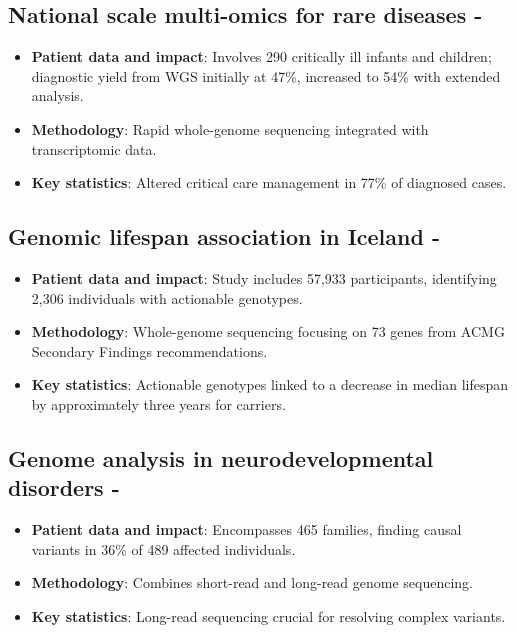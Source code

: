 \subsection*{National scale multi-omics for rare diseases - \citep{lunke2023integrated}}
\begin{itemize}
  \item \textbf{Patient data and impact}: Involves 290 critically ill infants and children; diagnostic yield from WGS initially at 47\%, increased to 54\% with extended analysis.
  \item \textbf{Methodology}: Rapid whole-genome sequencing integrated with transcriptomic data.
  \item \textbf{Key statistics}: Altered critical care management in 77\% of diagnosed cases.
\end{itemize}

\subsection*{Genomic lifespan association in Iceland - \citep{jensson2023actionable}}
\begin{itemize}
  \item \textbf{Patient data and impact}: Study includes 57,933 participants, identifying 2,306 individuals with actionable genotypes.
  \item \textbf{Methodology}: Whole-genome sequencing focusing on 73 genes from ACMG Secondary Findings recommendations.
  \item \textbf{Key statistics}: Actionable genotypes linked to a decrease in median lifespan by approximately three years for carriers.
\end{itemize}

\subsection*{Genome analysis in neurodevelopmental disorders - \citep{sanchis2023genome}}
\begin{itemize}
  \item \textbf{Patient data and impact}: Encompasses 465 families, finding causal variants in 36\% of 489 affected individuals.
  \item \textbf{Methodology}: Combines short-read and long-read genome sequencing.
  \item \textbf{Key statistics}: Long-read sequencing crucial for resolving complex variants.
\end{itemize}

